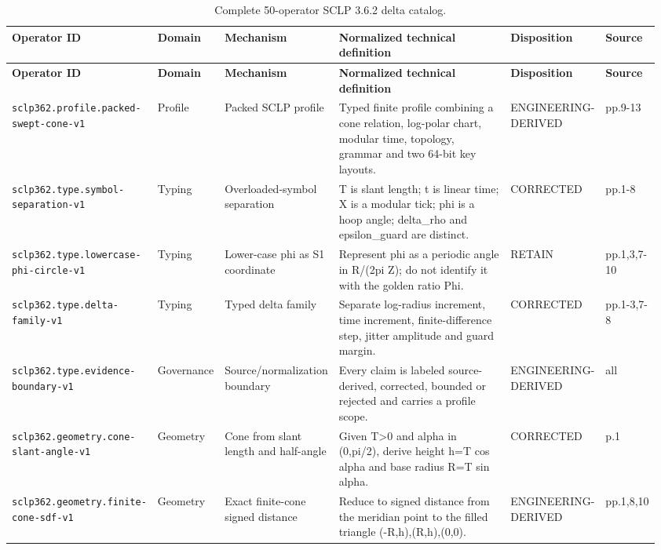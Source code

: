 \begin{landscape}
\scriptsize
\setlength{\tabcolsep}{2.5pt}
\renewcommand{\arraystretch}{1.14}
\begin{longtable}{p{0.19\linewidth} p{0.08\linewidth} p{0.15\linewidth} p{0.37\linewidth} p{0.10\linewidth} p{0.07\linewidth}}
\caption{Complete 50-operator SCLP 3.6.2 delta catalog.}\label{tab:sclp-ops}\\
\toprule
\textbf{Operator ID} & \textbf{Domain} & \textbf{Mechanism} & \textbf{Normalized technical definition} & \textbf{Disposition} & \textbf{Source}\\
\midrule
\endfirsthead
\toprule
\textbf{Operator ID} & \textbf{Domain} & \textbf{Mechanism} & \textbf{Normalized technical definition} & \textbf{Disposition} & \textbf{Source}\\
\midrule
\endhead
\texttt{sclp362.profile.packed-swept-cone-v1} & Profile & Packed SCLP profile & Typed finite profile combining a cone relation, log-polar chart, modular time, topology, grammar and two 64-bit key layouts. & ENGINEERING-DERIVED & pp.9-13\\
\texttt{sclp362.type.symbol-separation-v1} & Typing & Overloaded-symbol separation & T is slant length; t is linear time; X is a modular tick; phi is a hoop angle; delta\_rho and epsilon\_guard are distinct. & CORRECTED & pp.1-8\\
\texttt{sclp362.type.lowercase-phi-circle-v1} & Typing & Lower-case phi as S1 coordinate & Represent phi as a periodic angle in R/(2pi Z); do not identify it with the golden ratio Phi. & RETAIN & pp.1,3,7-10\\
\texttt{sclp362.type.delta-family-v1} & Typing & Typed delta family & Separate log-radius increment, time increment, finite-difference step, jitter amplitude and guard margin. & CORRECTED & pp.1-3,7-8\\
\texttt{sclp362.type.evidence-boundary-v1} & Governance & Source/normalization boundary & Every claim is labeled source-derived, corrected, bounded or rejected and carries a profile scope. & ENGINEERING-DERIVED & all\\
\texttt{sclp362.geometry.cone-slant-angle-v1} & Geometry & Cone from slant length and half-angle & Given T\textgreater{}0 and alpha in (0,pi/2), derive height h=T cos alpha and base radius R=T sin alpha. & CORRECTED & p.1\\
\texttt{sclp362.geometry.finite-cone-sdf-v1} & Geometry & Exact finite-cone signed distance & Reduce to signed distance from the meridian point to the filled triangle (-R,h),(R,h),(0,0). & ENGINEERING-DERIVED & pp.1,8,10\\

\end{longtable}
\end{landscape}

